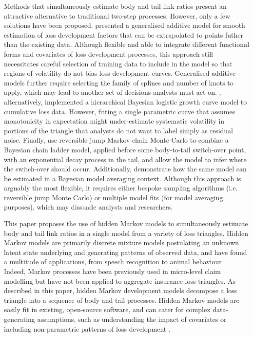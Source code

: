 Methods that simultaneously estimate body
and tail link ratios 
present an attractive alternative
to traditional two-step processes. However, only a few
solutions have been proposed.
\cite{englandverrall2001} presented a generalised
additive model for smooth estimation of loss development
factors that can be extrapolated to points futher
than the existing data. Although flexible and able to
integrate different functional forms and covariates
of loss development processes, this approach
still necessitates careful selection of training data
to include in the model so that regions of volatility
do not bias loss development curves. Generalised additive models
further require selecting the family of splines and
number of knots to apply, which may lead to another
set of decisions analysts must act on.
\cite{zhang2012}, alternatively,
implemented a hierarchical Bayesian logistic growth curve model to
cumulative loss data. However, fitting a single parametric
curve that assumes monotonicity in expectation might under-estimate
systematic volatility in portions of the triangle that
analysts do not want to label simply as residual noise.
Finally, \cite{verrall2012} use reversible jump Markov
chain Monte Carlo to combine a Bayesian chain ladder model,
applied before some body-to-tail switch-over point, with an exponential
decay process in the tail, and allow the model to infer
where the switch-over should occur. Additionally, 
\cite{verrall2015} demonstrate how the same model
can be estimated in a Bayesian model averaging context.
Although this approach is arguably the most flexible,
it requires either bespoke sampling algorithms (i.e. reversible
jump Monte Carlo) or
multiple model fits (for model averaging purposes),
which may dissuade analysts and researchers.

This paper proposes the use of hidden Markov models
to simultaneously estimate body and tail link ratios
in a single model from a variety of loss triangles. 
Hidden Markov models are 
primarily discrete mixture models postulating an unknown 
latent state
underlying and generating patterns of observed data,
and have found a multitude of applications, 
from speech recognition \citep[e.g.][]{rabiner1989}
to animal behaviour \citep[e.g.][]{leos2017}.
Indeed, Markov processes have been previously used
in micro-level claim 
modelling \citep[e.g.][]{hesselager1994} but
have not been applied to aggregate insurance
loss triangles.
As described in this paper, hidden Markov 
development models decompose 
a loss triangle into a sequence of body and tail
processes.
Hidden Markov models are easily fit
in existing, open-source software, and can cater
for complex data-generating assumptions,
such as understanding the impact of covariates
or including non-parametric patterns of loss development 
\citep{englandverrall2001},

